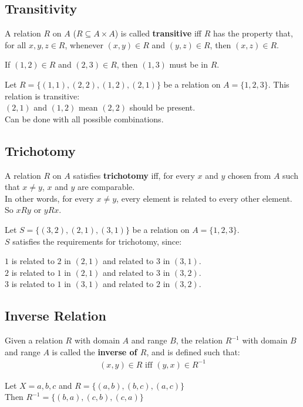 \documentclass[../notes.tex]{subfiles}
\begin{document}
			\subsection{Transitivity}
				A relation $R$ on $A$ ($R \subseteq A \times A$) is called \textbf{transitive} iff $R$ has the property that, for all $x, y, z \in R$, whenever $(x, y) \in R$ and $(y, z) \in R$, then $(x, z) \in R$.
				\begin{example}
					If $(1, 2) \in R$ and $(2, 3) \in R$, then $(1, 3)$ must be in $R$.
				\end{example}
				\begin{example}
					Let $R = \bigl\{(1, 1), (2, 2), (1, 2), (2, 1)\bigr\}$ be a relation on $A = \{1, 2, 3\}$. This relation is transitive:\\
					$(2, 1)$ and $(1, 2)$ mean $(2, 2)$ should be present.\\
					Can be done with all possible combinations.
				\end{example}
			\subsection{Trichotomy}
				A relation $R$ on $A$ satisfies \textbf{trichotomy} iff, for every $x$ and $y$ chosen from $A$ such that $x \neq y$, $x$ and $y$ are comparable.\\
				In other words, for every $x \neq y$, every element is related to every other element. So $x R y$ or $y R x$.
				\begin{example}
					Let $S = \bigl\{(3, 2), (2, 1), (3, 1)\bigr\}$ be a relation on $A = \{1, 2, 3\}$.\\
					$S$ satisfies the requirements for trichotomy, since:
					\begin{indentparagraph}
						$1$ is related to $2$ in $(2, 1)$ and related to $3$ in $(3, 1)$.\\
						$2$ is related to $1$ in $(2, 1)$ and related to $3$ in $(3, 2)$.\\
						$3$ is related to $1$ in $(3, 1)$ and related to $2$ in $(3, 2)$.
					\end{indentparagraph}
				\end{example}
			\subsection{Inverse Relation}
				Given a relation $R$ with domain $A$ and range $B$, the relation $R^{-1}$ with domain $B$ and range $A$ is called the \textbf{inverse of $R$}, and is defined such that:
				\begin{align*}
					(x, y) \in R \text{ iff } (y, x) \in R^{-1}
				\end{align*}
				\begin{example}
					Let $X = {a, b, c}$ and $R = \bigl\{(a, b), (b, c), (a, c)\bigr\}$\\
					Then $R^{-1} = \bigl\{(b, a), (c, b), (c, a)\bigr\}$
				\end{example}
\end{document}
